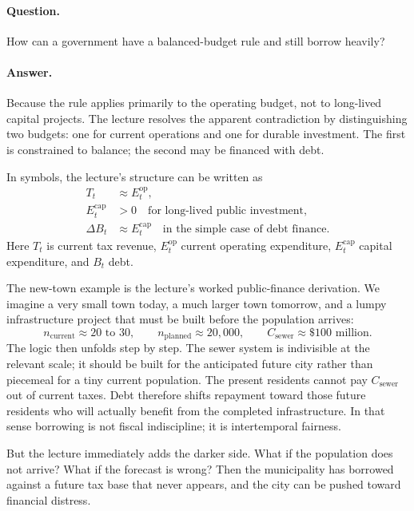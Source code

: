 \paragraph{Question.} How can a government have a balanced-budget rule and still borrow heavily?

\paragraph{Answer.} Because the rule applies primarily to the operating budget, not to long-lived capital projects. The lecture resolves the apparent contradiction by distinguishing two budgets: one for current operations and one for durable investment. The first is constrained to balance; the second may be financed with debt.

In symbols, the lecture's structure can be written as
\begin{align}
T_t &\approx E_t^{\mathrm{op}},\\
E_t^{\mathrm{cap}} &> 0 \quad \text{for long-lived public investment},\\
\Delta B_t &\approx E_t^{\mathrm{cap}} \quad \text{in the simple case of debt finance}.
\end{align}
Here \(T_t\) is current tax revenue, \(E_t^{\mathrm{op}}\) current operating expenditure, \(E_t^{\mathrm{cap}}\) capital expenditure, and \(B_t\) debt.

The new-town example is the lecture's worked public-finance derivation. We imagine a very small town today, a much larger town tomorrow, and a lumpy infrastructure project that must be built before the population arrives:
\begin{equation}
n_{\text{current}} \approx 20\text{ to }30,
\qquad
n_{\text{planned}} \approx 20{,}000,
\qquad
C_{\text{sewer}} \approx \$100\text{ million}.
\end{equation}
The logic then unfolds step by step. The sewer system is indivisible at the relevant scale; it should be built for the anticipated future city rather than piecemeal for a tiny current population. The present residents cannot pay \(C_{\text{sewer}}\) out of current taxes. Debt therefore shifts repayment toward those future residents who will actually benefit from the completed infrastructure. In that sense borrowing is not fiscal indiscipline; it is intertemporal fairness.

But the lecture immediately adds the darker side. What if the population does not arrive? What if the forecast is wrong? Then the municipality has borrowed against a future tax base that never appears, and the city can be pushed toward financial distress.

